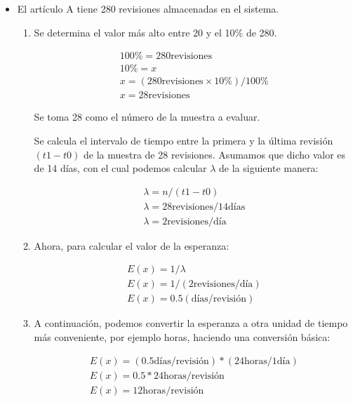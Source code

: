 \begin{itemize}

\item El artículo A tiene 280 revisiones almacenadas en el sistema.

  \begin{enumerate}
  \item Se determina el valor más alto entre 20 y el 10\% de 280.

  \begin{gather*}
  100\% = 280 \text{revisiones}\\
  10\% = x\\
  x = (280 \text{revisiones} \times 10\%) / 100\%\\
  x = 28 \text{revisiones}
  \end{gather*}

  Se toma 28 como el número de la muestra a evaluar.

  Se calcula el intervalo de tiempo entre la primera y la última revisión $(t1 - t0)$ de la muestra de 28 revisiones.
  Asumamos que dicho valor es de 14 días, con el cual podemos calcular $\lambda$ de la siguiente manera:

  \begin{gather*}
  \lambda = n / (t1 - t0)\\
  \lambda = 28 \text{revisiones} / 14 \text{días}\\
  \lambda = 2 \text{revisiones} / \text{día}
  \end{gather*}

  \item Ahora, para calcular el valor de la esperanza:

  \begin{gather*}
  E(x)= 1 / \lambda\\
  E(x)= 1 / (2 \text{revisiones} / \text{día})\\
  E(x)= 0.5 (\text{días} / \text{revisión})
  \end{gather*}

  \item A continuación, podemos convertir la esperanza a otra unidad de tiempo más conveniente, por ejemplo horas, haciendo una conversión básica:

  \begin{gather*}
  E(x)= (0.5 \text{días} / \text{revisión}) * (24\text{horas}/1 \text{día})\\
  E(x)= 0.5*24 \text{horas} / \text{revisión} \\
  E(x) = 12 \text{horas}/ \text{revisión}
  \end{gather*}


\end{enumerate}
\end{itemize}
